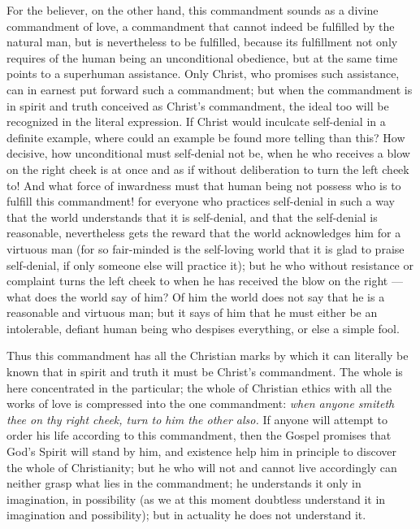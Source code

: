 \documentclass[12pt,a4paper]{book}
\begin{document}
For the believer, on the other hand, this commandment sounds as a divine commandment
of love, a commandment that cannot indeed be fulfilled by the natural man, but is
nevertheless to be fulfilled, because its fulfillment not only requires of the human
being an unconditional obedience, but at the same time points to a superhuman
assistance. Only Christ, who promises such assistance, can in earnest put forward such
a commandment; but when the commandment is in spirit and truth conceived as Christ's
commandment, the ideal too will be recognized in the literal expression. If Christ
would inculcate self-denial in a definite example, where could an example be found
more telling than this? How decisive, how unconditional must self-denial not be, when
he who receives a blow on the right cheek is at once and as if without deliberation to
turn the left cheek to! And what
force of inwardness must that human being not possess who is to fulfill this
commandment! for everyone who practices self-denial in such a way that the world
understands that it is self-denial, and that the self-denial is reasonable,
nevertheless gets the reward that the world acknowledges him for a virtuous man (for so
fair-minded is the self-loving world that it is glad to praise self-denial, if only
someone else will practice it); but he who without resistance or complaint turns the
left cheek to when he has received the blow on the right --- what does the world say of
him? Of him the world does not say that he is a reasonable and virtuous man; but it
says of him that he must either be an intolerable, defiant
human being who despises everything, or else a simple fool.

Thus this commandment has all the Christian marks by which it can literally be known
that in spirit and truth it must be Christ's commandment. The whole is here concentrated
in the particular; the whole of Christian ethics with all the works of love is compressed
into the one commandment: \emph{when anyone smiteth thee on thy right cheek, turn to him
the other also.} If anyone will attempt to order his life according to this commandment,
then the Gospel promises that God's Spirit will stand by him, and existence help him in
principle to discover the whole of Christianity; but he who will not and cannot live
accordingly can neither grasp what lies in the commandment; he understands it only in
imagination, in possibility (as we at this moment doubtless understand it in imagination
and possibility); but in actuality he does not understand it.
\end{document}
